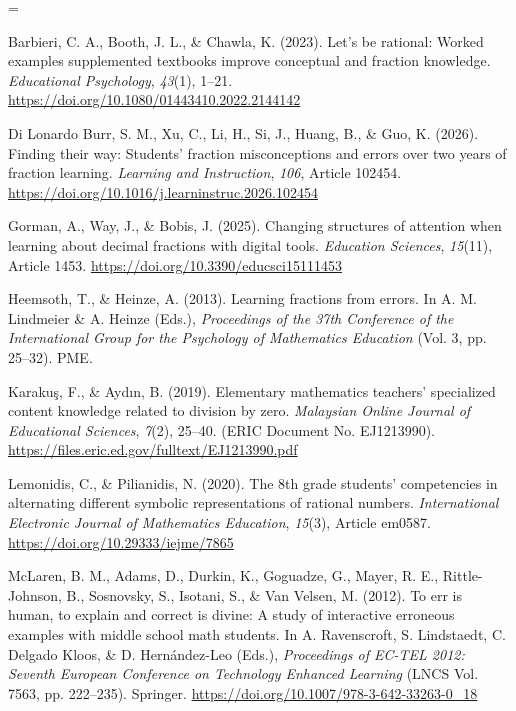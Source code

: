 \documentclass[a4paper,12pt]{article}
\begin{document}
{\TimesEn\linespread{1.0}\selectfont\fontsize{10.8pt}{17.4pt}\selectfont
\setlength{\parskip}{6.0pt}
\everypar={\hangindent=0.85cm }

Barbieri, C. A., Booth, J. L., \& Chawla, K. (2023). Let’s be rational: Worked examples supplemented textbooks improve conceptual and fraction knowledge. \textit{Educational Psychology}, \textit{43}(1), 1–21. \url{https://doi.org/10.1080/01443410.2022.2144142}

Di Lonardo Burr, S. M., Xu, C., Li, H., Si, J., Huang, B., \& Guo, K. (2026). Finding their way: Students’ fraction misconceptions and errors over two years of fraction learning. \textit{Learning and Instruction}, \textit{106}, Article 102454. \url{https://doi.org/10.1016/j.learninstruc.2026.102454}

Gorman, A., Way, J., \& Bobis, J. (2025). Changing structures of attention when learning about decimal fractions with digital tools. \textit{Education Sciences}, \textit{15}(11), Article 1453. \url{https://doi.org/10.3390/educsci15111453}

Heemsoth, T., \& Heinze, A. (2013). Learning fractions from errors. In A. M. Lindmeier \& A. Heinze (Eds.), \textit{Proceedings of the 37th Conference of the International Group for the Psychology of Mathematics Education} (Vol. 3, pp. 25–32). PME.

Karakuş, F., \& Aydın, B. (2019). Elementary mathematics teachers’ specialized content knowledge related to division by zero. \textit{Malaysian Online Journal of Educational Sciences}, \textit{7}(2), 25–40. (ERIC Document No. EJ1213990). \url{https://files.eric.ed.gov/fulltext/EJ1213990.pdf}

Lemonidis, C., \& Pilianidis, N. (2020). The 8th grade students’ competencies in alternating different symbolic representations of rational numbers. \textit{International Electronic Journal of Mathematics Education}, \textit{15}(3), Article em0587. \url{https://doi.org/10.29333/iejme/7865}

McLaren, B. M., Adams, D., Durkin, K., Goguadze, G., Mayer, R. E., Rittle-Johnson, B., Sosnovsky, S., Isotani, S., \& Van Velsen, M. (2012). To err is human, to explain and correct is divine: A study of interactive erroneous examples with middle school math students. In A. Ravenscroft, S. Lindstaedt, C. Delgado Kloos, \& D. Hernández-Leo (Eds.), \textit{Proceedings of EC-TEL 2012: Seventh European Conference on Technology Enhanced Learning} (LNCS Vol. 7563, pp. 222–235). Springer. \url{https://doi.org/10.1007/978-3-642-33263-0_18}

}
\end{document}
